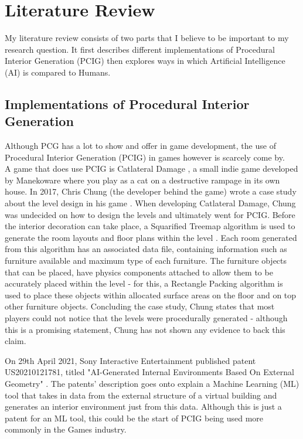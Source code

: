\section{Literature Review}
My literature review consists of two parts that I believe to be important to my research question. It first describes different implementations of Procedural Interior Generation (PCIG) then explores ways in which Artificial Intelligence (AI) is compared to Humans.

\subsection{Implementations of Procedural Interior Generation}
Although PCG has a lot to show and offer in game development, the use of Procedural Interior Generation (PCIG) in games however is scarcely come by.
\\
A game that does use PCIG is Catlateral Damage \cite{game:catlateral}, a small indie game developed by Manekoware where you play as a cat on a destructive rampage in its own house. In 2017, Chris Chung (the developer behind the game) wrote a case study about the level design in his game \cite[Chapter~6]{pcg_in_gd}. When developing Catlateral Damage, Chung was undecided on how to design the levels and ultimately went for PCIG\cite[Chapter~6]{pcg_in_gd}. Before the interior decoration can take place, a Squarified Treemap algorithm is used to generate the room layouts and floor plans within the level \cite{squarified-treemap}. Each room generated from this algorithm has an associated data file, containing information such as furniture available and maximum type of each furniture. The furniture objects that can be placed, have physics components attached to allow them to be accurately placed within the level - for this, a Rectangle Packing algorithm \cite{rectangle-packing} is used to place these objects within allocated surface areas on the floor and on top other furniture objects. Concluding the case study, Chung states that most players could not notice that the levels were procedurally generated - although this is a promising statement, Chung has not shown any evidence to back this claim.

On 29th April 2021, Sony Interactive Entertainment published patent US20210121781, titled "AI-Generated Internal Environments Based On External Geometry" \cite{sony-patent}. The patents' description goes onto explain a Machine Learning (ML) tool that takes in data from the external structure of a virtual building and generates an interior environment just from this data. Although this is just a patent for an ML tool, this could be the start of PCIG being used more commonly in the Games industry.

